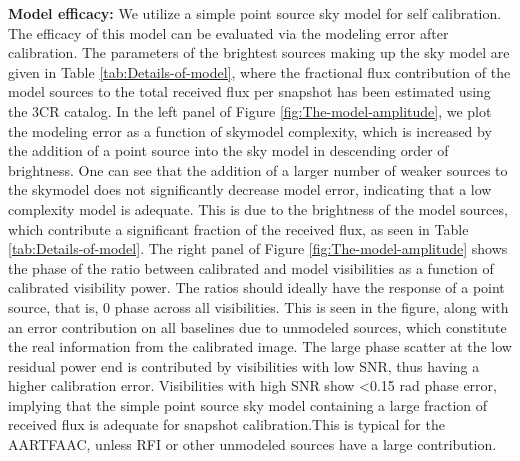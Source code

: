 \documentclass[referee]{aa}
\begin{document}
\textbf{Model efficacy:  } We utilize a  simple point source sky  model for self
calibration. The efficacy of this model  can be evaluated via the modeling error
after calibration.   The parameters of the  brightest sources making  up the sky
model are  given in Table \ref{tab:Details-of-model}, where  the fractional flux
contribution of  the model sources to  the total received flux  per snapshot has
been  estimated   using  the  3CR  catalog.    In  the  left   panel  of  Figure
\ref{fig:The-model-amplitude},  we plot  the  modeling error  as  a function  of
skymodel complexity, which  is increased by the addition of  a point source into
the sky model  in descending order of brightness. One can  see that the addition
of a  larger number  of weaker  sources to the  skymodel does  not significantly
decrease model error, indicating that  a low complexity model is adequate.  This
is due  to the brightness of  the model sources, which  contribute a significant
fraction of the received flux, as seen in Table \ref{tab:Details-of-model}.  The
right panel of Figure \ref{fig:The-model-amplitude} shows the phase of the ratio
between calibrated and model visibilities as a function of calibrated visibility
power. The ratios should ideally have the response of a point source, that is, 0
phase across all visibilities.  This is  seen in the figure, along with an error
contribution on  all baselines  due to unmodeled  sources, which  constitute the
real information from  the calibrated image. The large phase  scatter at the low
residual power  end is contributed by  visibilities with low SNR,  thus having a
higher  calibration error.   Visibilities with  high  SNR show  <0.15 rad  phase
error,  implying that  the  simple point  source  sky model  containing a  large
fraction of received  flux is adequate for snapshot  calibration.This is typical
for  the  AARTFAAC,  unless  RFI   or  other  unmodeled  sources  have  a  large
contribution.
\end{document}
